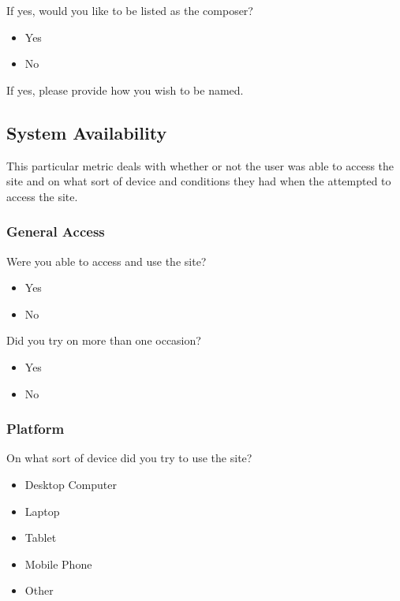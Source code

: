 \noindent If yes, would you like to be listed as the composer?

\begin{itemize}
	\item Yes
	\item No
\end{itemize}

\noindent If yes, please provide how you wish to be named.

\subsection{System Availability}
\label{subsec:systemavailability}

This particular metric deals with whether or not the user was able to access the site and on what sort of device and conditions they had when the attempted to access the site.

\subsubsection{General Access}
\label{subsubsec:generalaccess}

Were you able to access and use the site?

\begin{itemize}
	\item Yes
	\item No
\end{itemize}

\vspace{\baselineskip}

\noindent Did you try on more than one occasion?

\begin{itemize}
	\item Yes
	\item No
\end{itemize}

\subsubsection{Platform}
\label{subsubsec:platform}

On what sort of device did you try to use the site?

\begin{itemize}
	\item Desktop Computer
	\item Laptop
	\item Tablet
	\item Mobile Phone
	\item Other
\end{itemize}

